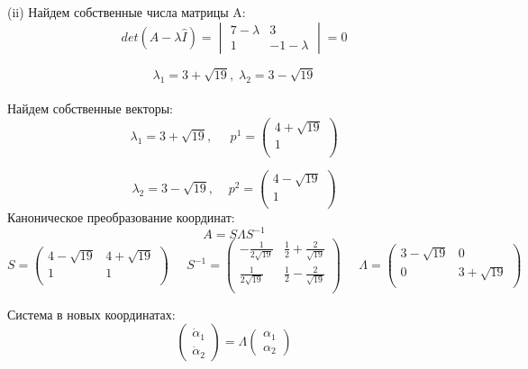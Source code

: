 \documentclass[a4paper, 12pt]{article}
\begin{document}
(ii) Найдем собственные числа матрицы A:
\[det(A-\lambda \hat{I})=
\begin{vmatrix}
7-\lambda & 3 \\
1 & -1-\lambda
\end{vmatrix}
=0\]

\[\lambda_1=3+\sqrt{19}, \; \lambda_2=3-\sqrt{19}\]
\\Найдем собственные векторы:
\[\lambda_1=3+\sqrt{19},\;\;\;\;\; p^1=
\left(
\begin{array}{cc}
4+\sqrt{19}\\
1\\
\end{array}
\right)
\]



\[\lambda_2=3-\sqrt{19},\;\;\;\; p^2=
\left(
\begin{array}{cc}
4-\sqrt{19}\\
1\\
\end{array}
\right)
\]
Каноническое преобразование координат:
\[A = S\Lambda S^{-1}\]
\[
S = \left(
\begin{array}{cc}
4-\sqrt{19} & 4+\sqrt{19}\\
1 & 1\\
\end{array}
\right)\;\;\;\;\;
S^{-1} = \left(
\begin{array}{cc}
-\frac{1}{2\sqrt{19}} & \frac 1 2 +\frac{2}{\sqrt{19}}\\
\frac{1}{2\sqrt{19}} & \frac 1 2 -\frac{2}{\sqrt{19}}\\
\end{array}\right)\;\;\;\;\;
\Lambda = \left(
\begin{array}{cc}
3-\sqrt{19} & 0\\
0 & 3+\sqrt{19}\\
\end{array}\right)
\]

Система в новых координатах:
\[\left(
\begin{array}{c}
\dot{\alpha}_1\\
\dot{\alpha}_2
\end{array}
\right)=\Lambda\left(
\begin{array}{c}
{\alpha}_1 \\
{\alpha}_2
\end{array}
\right)\]
\end{document}
